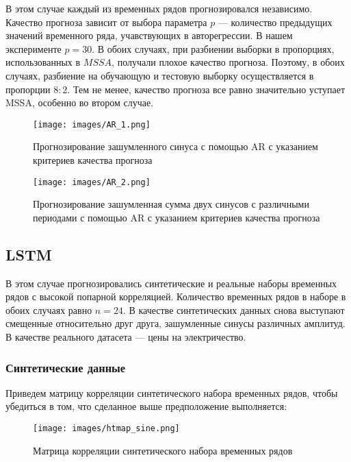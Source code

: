 \documentclass{article}
\begin{document}
В этом случае каждый из временных рядов прогнозировался независимо. Качество прогноза зависит от выбора параметра $p$ --- количество предыдущих значений временного ряда, учавствующих в авторегрессии. В нашем эксперименте $p = 30$. В обоих случаях, при разбиении выборки в пропорциях, использованных в $MSSA$, получали плохое качество прогноза. Поэтому, в обоих случаях, разбиение на обучающую и тестовую выборку осуществляется в пропорции $8:2$. Тем не менее, качество прогноза все равно значительно уступает MSSA, особенно во втором случае.

\begin{figure}[!htbp]
\centering
{\texttt{[image: images/AR\_1.png]} }
\caption{Прогнозирование зашумленного синуса с помощью AR с указанием критериев качества прогноза}
\label{fig:ARsine}
\end{figure}

\begin{figure}[!htbp]
\centering
{\texttt{[image: images/AR\_2.png]} }
\caption{Прогнозирование зашумленная сумма двух синусов с различными периодами с помощью AR с указанием критериев качества прогноза}
\label{fig:AR2sines}
\end{figure}

\subsection{LSTM}

В этом случае прогнозировались синтетические и реальные наборы временных рядов с высокой попарной корреляцией. Количество временных рядов в наборе в обоих случаях равно $n = 24$. В качестве синтетических данных снова выступают смещенные относительно друг друга, зашумленные синусы различных амплитуд. В качестве реального датасета --- цены на электричество.

\subsubsection{Синтетические данные}

Приведем матрицу корреляции синтетического набора временных рядов, чтобы убедиться в том, что сделанное выше предположение выполняется:


\begin{figure}[!htbp]
\centering
{\texttt{[image: images/htmap\_sine.png]} }
\caption{Матрица корреляции синтетического набора временных рядов}
\label{fig:Heatsine}
\end{figure}
\end{document}
